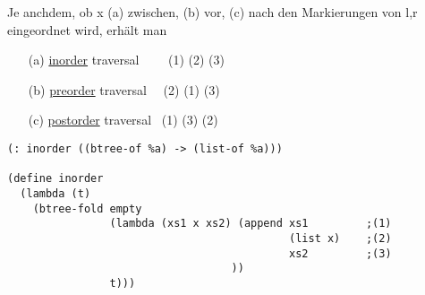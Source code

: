 \documentclass[a4paper,12pt]{article}
\begin{document}
Je anchdem, ob x (a) zwischen, (b) vor, (c) nach den Markierungen von l,r eingeordnet wird, erhält man 
\begin{itemize}
\item[(a)] \uline{inorder} traversal \ \ \ \ (1) (2) (3)
\item[(b)] \uline{preorder} traversal \ \ (2) (1) (3) 
\item[(c)] \uline{postorder} traversal \ (1) (3) (2)
\end{itemize}
\begin{lstlisting}[style=customc]
(: inorder ((btree-of %a) -> (list-of %a)))

(define inorder
  (lambda (t)
    (btree-fold empty
                (lambda (xs1 x xs2) (append xs1         ;(1)
                                            (list x)    ;(2)
                                            xs2         ;(3)
                                   )) 
                t)))
\end{lstlisting}
\\
\end{document}
